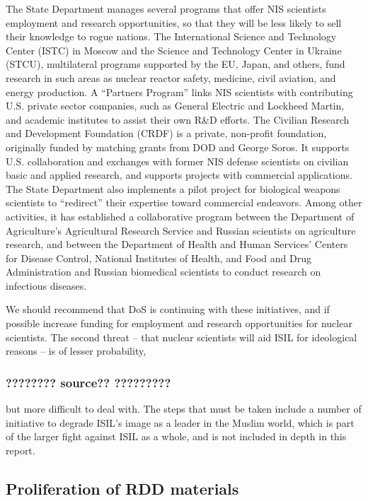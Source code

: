 \documentclass{report}
\begin{document}
{The State Department manages several programs that offer NIS scientists employment and research opportunities, so that they will be less likely to sell their knowledge to rogue nations. The International Science and Technology Center (ISTC) in Moscow and the Science and Technology Center in Ukraine (STCU), multilateral programs supported by the EU, Japan, and others, fund research in such areas as nuclear reactor safety, medicine, civil aviation, and energy production. A \enquote{Partners Program} links NIS scientists with contributing U.S. private sector companies, such as General Electric and Lockheed Martin, and academic institutes to assist their own R\&D efforts. The Civilian Research and Development Foundation (CRDF) is a private, non-profit foundation, originally funded by matching grants from DOD and George Soros. It supports U.S. collaboration and exchanges with former NIS defense scientists on civilian basic and applied research, and supports projects with commercial applications. The State Department also implements a pilot project for biological weapons scientists to \enquote{redirect} their expertise toward commercial endeavors. Among other activities, it has established a collaborative program between the Department of Agriculture's Agricultural Research Service and Russian scientists on agriculture research, and between the Department of Health and Human Services' Centers for Disease Control, National Institutes of Health, and Food and Drug Administration and Russian biomedical scientists to conduct research on infectious diseases. }

We should recommend that DoS is continuing with these initiatives, and if possible increase funding for employment and research opportunities for nuclear scientists. The second threat – that nuclear scientists will aid ISIL for ideological reasons – is of lesser probability, \subsubsection{???????? source?? ?????????} but more difficult to deal with. The steps that must be taken include a number of initiative to degrade ISIL's image as a leader in the Muslim world, which is part of the larger fight against ISIL as a whole, and is not included in depth in this report. 

\subsection{Proliferation of RDD materials}
\end{document}
